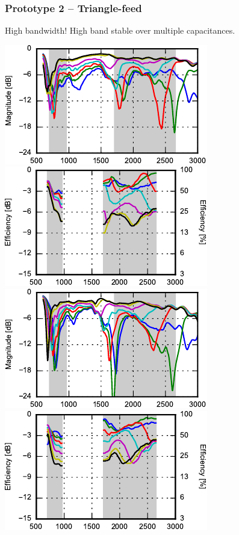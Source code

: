 \begin{frame}
    \frametitle{Prototype 2 -- Triangle-feed}
    \textcolor{gg}{High bandwidth!} High band stable over multiple capacitances.
    \begin{center}
        \includegraphics{img/soren/proto/design2sn/s11.pdf}
        \includegraphics{img/soren/proto/design2sn/efftop.pdf}\\
        \includegraphics{img/soren/proto/design2sn/s22.pdf}
        \includegraphics{img/soren/proto/design2sn/effside.pdf}
    \end{center}
    \legendfooter
\end{frame}

